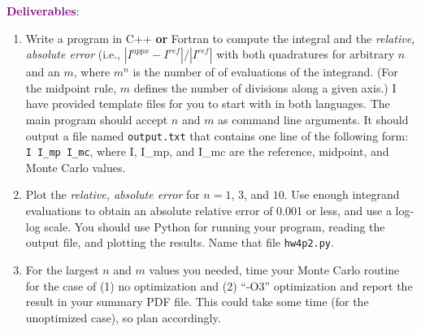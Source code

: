 \documentclass[11pt]{article}
\begin{document}
\vspace{11pt}
\textcolor{purple}{{\bf Deliverables}}: 
\begin{enumerate}
 \item Write a program in C++ {\bf or} Fortran to compute 
       the integral and the {\it relative, absolute error} (i.e.,
       $|I^{appx}-I^{ref}|/|I^{ref}|$
       with both 
       quadratures for arbitrary $n$ and an $m$, where 
       $m^n$ is the number of 
       of evaluations of the integrand.  (For the midpoint rule, 
       $m$ defines the number of divisions along a given axis.)
       I have provided template files for you to start with in 
       both languages.
       The main program should accept $n$ and $m$ as command line
       arguments.  It should output a file named {\tt output.txt} 
       that contains one 
       line of the following form: {\tt I I\_mp I\_mc}, where
       I, I\_mp, and I\_mc are the reference, midpoint, and Monte 
       Carlo values. 
 \item Plot the  {\it relative, absolute error} for
       $n = 1$, $3$, and $10$.  Use enough integrand evaluations 
       to obtain an absolute relative error of
       0.001 or less, and use a log-log scale.  You should use Python 
       for running your program, reading the output file, and 
       plotting the results. Name that file {\tt hw4p2.py}.  
 \item For the largest $n$ and $m$ values you needed, time your 
       Monte Carlo routine for the case of (1) no optimization and (2) 
       ``-O3'' optimization and report the result in your summary PDF file.
       This could take some time (for the unoptimized case), so 
       plan accordingly.
\end{enumerate}
\end{document}
